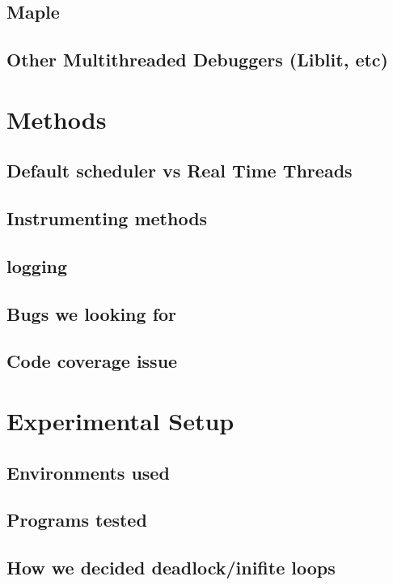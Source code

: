 \documentclass[10pt,]{article} %
\begin{document}
\subsection{Maple}

\subsection{Other Multithreaded Debuggers (Liblit, etc)}


\section{Methods}


\subsection{Default scheduler vs Real Time Threads}

\subsection{Instrumenting methods}

\subsection{logging}

\subsection{Bugs we looking for}

\subsection{Code coverage issue}


\section{Experimental Setup}


\subsection{Environments used}

\subsection{Programs tested}
	
\subsection{How we decided deadlock/inifite loops}
\end{document}
